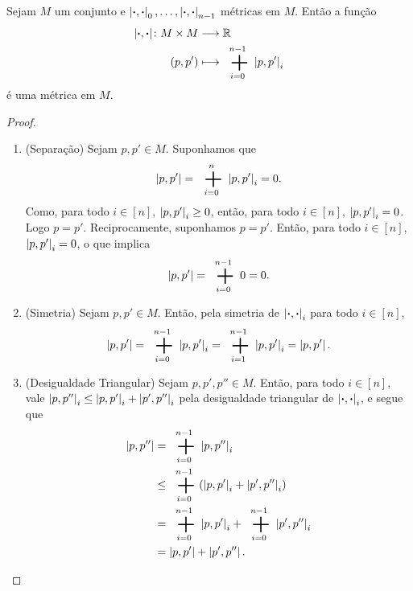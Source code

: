 \begin{proposition}
Sejam $M$ um conjunto e $\left\vert{\bm{\cdot}},{\bm{\cdot}}\right\vert_0, \ldots, \left\vert{\bm{\cdot}},{\bm{\cdot}}\right\vert_{n-1}$ métricas em $M$. Então a função
	\begin{align*}
		\func{\dist{\var}{\var}}{M \times M}{\R}{(p,p')}{\sum_{i=0}^{n-1} \dist{p}{p'}_i}
	\end{align*}
é uma métrica em $M$.
\end{proposition}
\begin{proof}
	\begin{enumerate}
	\item (Separação) Sejam $p,p' \in M$. Suponhamos que
	\begin{equation*}
	\dist{p}{p'} = \sum_{i=0}^n \dist{p}{p'}_i = 0.
	\end{equation*}
Como, para todo $i \in [n]$, $\left\vert{p},{p'}\right\vert_i \geq 0$, então, para todo $i \in [n]$, $\left\vert{p},{p'}\right\vert_i = 0$. Logo $p=p'$. Reciprocamente, suponhamos $p=p'$. Então, para todo $i \in [n]$, $\left\vert{p},{p'}\right\vert_i=0$, o que implica
	\begin{equation*}
	\dist{p}{p'} = \sum_{i=0}^{n-1} 0 = 0.
	\end{equation*}

	\item (Simetria) Sejam $p,p' \in M$. Então, pela simetria de $\left\vert{\bm{\cdot}},{\bm{\cdot}}\right\vert_i$ para todo $i \in [n]$,
	\begin{equation*}
	\dist{p}{p'} = \sum_{i=0}^{n-1} \dist{p}{p'}_i = \sum_{i=1}^{n-1} \dist{p}{p'}_i = \dist{p}{p'}.
	\end{equation*}

	\item (Desigualdade Triangular) Sejam $p,p',p'' \in M$. Então, para todo $i \in [n]$, vale $\left\vert{p},{p''}\right\vert_i \leq \left\vert{p},{p'}\right\vert_i+\left\vert{p'},{p''}\right\vert_i$ pela desigualdade triangular de $\left\vert{\bm{\cdot}},{\bm{\cdot}}\right\vert_i$, e segue que
	\begin{align*}
	\dist{p}{p''} &= \sum_{i=0}^{n-1} \dist{p}{p''}_i \\
				&\leq \sum_{i=0}^{n-1} (\dist{p}{p'}_i+\dist{p'}{p''}_i) \\
				&= \sum_{i=0}^{n-1} \dist{p}{p'}_i + \sum_{i=0}^{n-1} \dist{p'}{p''}_i \\
				&= \dist{p}{p'}+\dist{p'}{p''}. \qedhere
	\end{align*}
	\end{enumerate}
\end{proof}

